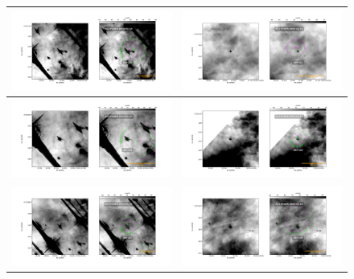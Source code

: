 \begin{figure}[htp]
\centering
\begin{tabular}{|l|l|}
\hline
   \includegraphics[width=0.47\linewidth,  trim=60 50 100 50, clip]{j8oc01010_wcs/158-323-Bally_01-images.pdf}
   &\includegraphics[width=0.47\linewidth,  trim=60 50 100 50, clip]{j8oc01010_wcs/159-221-Bally_01-images.pdf}\\ \hline
   \includegraphics[width=0.47\linewidth,  trim=60 50 100 50, clip]{j8oc01010_wcs/161-324-Bally_01-images.pdf}
   &\includegraphics[width=0.47\linewidth,  trim=60 50 100 50, clip]{j8oc01010_wcs/163-222-Bally_01-images.pdf}\\ \hline
   \includegraphics[width=0.47\linewidth,  trim=60 50 100 50, clip]{j8oc01010_wcs/163-317-Bally_01-images.pdf}
   &\includegraphics[width=0.47\linewidth,  trim=60 50 100 50, clip]{j8oc01010_wcs/165-235-Bally_01-images.pdf}\\ \hline

\end{tabular}
\end{figure}
